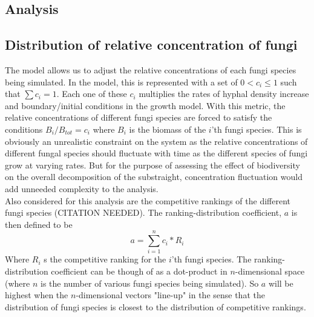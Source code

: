 \documentclass[12pt]{article}
\begin{document}
\begin{multicols}{2}
\section{Analysis}

\subsection{Distribution of relative concentration of fungi}
The model allows us to adjust the relative concentrations of each fungi species being simulated. In the model, this is represented with a set of $0<c_{i}\leq 1$ such that $\sum c_{i} = 1$. Each one of these $c_{i}$ multiplies the rates of hyphal density increase and boundary/initial conditions in the growth model. With this metric, the relative concentrations of different fungi species are forced to satisfy the conditions $B_{i}/B_{tot}=c_{i}$ where $B_{i}$ is the biomass of the $i$'th fungi species. This is obviously an unrealistic constraint on the system as the relative concentrations of different fungal species should fluctuate with time as the different species of fungi grow at varying rates. But for the purpose of assessing the effect of biodiversity on the overall decomposition of the substraight, concentration fluctuation would add unneeded complexity to the analysis. \\
Also considered for this analysis are the competitive rankings of the different fungi species (CITATION NEEDED). The ranking-distribution coefficient, $a$ is then defined to be
\begin{equation} \label{eq}
a = \sum_{i=1}^{n} c_{i}*R_{i}
\end{equation}
Where $R_{i}$ s the competitive ranking for the $i$'th fungi species. The ranking-distribution coefficient can be though of as a dot-product in $n$-dimensional space (where $n$ is the number of various fungi species being simulated). So $a$ will be highest when the $n$-dimensional vectors "line-up" in the sense that the distribution of fungi species is closest to the distribution of competitive rankings.\\

\end{multicols}
\end{document}
